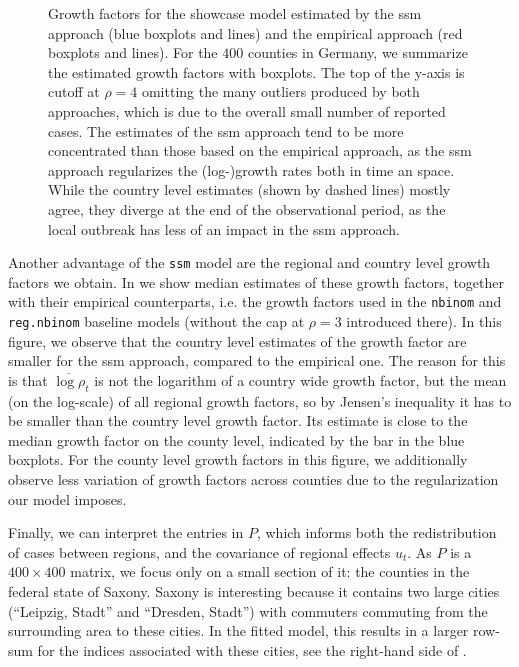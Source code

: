 \begin{figure}
    \resizebox{\textwidth}{!}{%
    }
    \caption{Growth factors for the showcase model estimated by the \acrshort{ssm} approach (blue boxplots and lines) and the empirical approach (red boxplots and lines). For the $400$ counties in Germany, we summarize the estimated growth factors with boxplots. The top of the y-axis is cutoff at $\rho = 4$ omitting the many outliers produced by both approaches, which is due to the overall small number of reported cases. The estimates of the \acrshort{ssm} approach tend to be more concentrated than those based on the empirical approach, as the \acrshort{ssm} approach regularizes the (log-)growth rates both in time an space. While the country level estimates (shown by dashed lines) mostly agree, they diverge at the end of the observational period, as the local outbreak \citep{Gunther2020SARSCoV2} has less of an impact in the \acrshort{ssm} approach.}
    \label{fig:regional_showcase_rho.tex}
\end{figure}

Another advantage of the \texttt{ssm} model are the regional and country level growth factors we obtain. In  we show median estimates of these growth factors, together with their empirical counterparts, i.e. the growth factors used in the \texttt{nbinom} and \texttt{reg.nbinom} baseline models (without the cap at $\rho = 3$ introduced there). 
In this figure, we observe that the country level estimates of the growth factor are smaller for the \acrshort{ssm} approach, compared to the empirical one. The reason for this is that $\overline{\log \rho}_{t}$ is not the logarithm of a country wide growth factor, but the mean (on the log-scale) of all regional growth factors, so by Jensen's inequality it has to be smaller than the country level growth factor. Its estimate is close to the median growth factor on the county level, indicated by the bar in the blue boxplots.  For the county level growth factors in this figure, we additionally observe less variation of growth factors across counties due to the regularization our model imposes.

Finally, we can interpret the entries in $P$, which informs both the redistribution of cases between regions, and the covariance of regional effects $u_{t}$. As $P$ is a $400\times 400$ matrix, we focus only on a small section of it: the counties in the federal state of Saxony. Saxony is interesting because it contains two large cities (``Leipzig, Stadt'' and ``Dresden, Stadt'') with commuters commuting from the surrounding area to these cities. In the fitted model, this results in a larger row-sum for the indices associated with these cities, see the right-hand side of .

